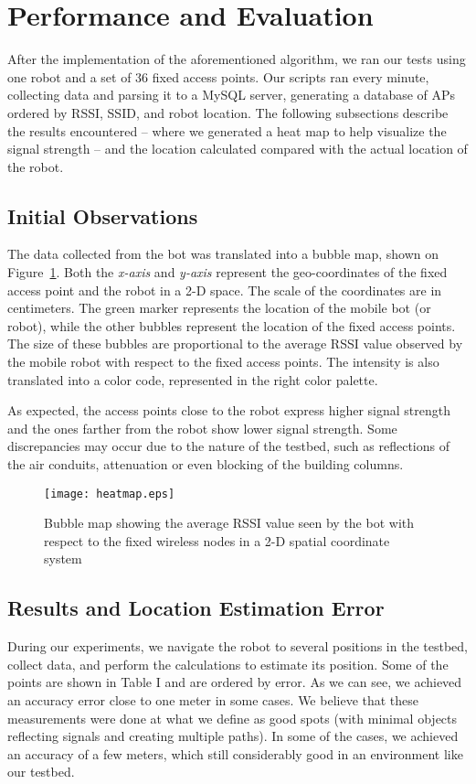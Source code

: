 \documentclass[journal]{IEEEtran} 				\IEEEoverridecommandlockouts 						\usepackage{amsmath,amssymb}
\begin{document}
\section{Performance and Evaluation}\label{sec:Performance and Evaluation}
After the implementation of the aforementioned algorithm, we ran our tests using one robot and a set of 36 fixed access points. Our scripts ran every minute, collecting data and parsing it to a MySQL server, generating a database of APs ordered by RSSI, SSID, and robot location.
The following subsections describe the results encountered -- where we generated a heat map to help visualize the signal strength -- and the location calculated compared with the actual location of the robot.

\subsection{Initial Observations}\label{sec:heat}

The data collected from the bot was translated into a bubble map, shown on Figure~\ref{fig:bubblemap}. Both the \textit{x-axis} and \textit{y-axis} represent the geo-coordinates of the fixed access point and the robot in a 2-D space. The scale of the coordinates are in centimeters. The green marker represents the location of the mobile bot (or robot), while the other bubbles represent the location of the fixed access points. The size of these bubbles are proportional to the average RSSI value observed by the mobile robot with respect to the fixed access points. The intensity is also translated into a color code, represented in the right color palette.

As expected, the access points close to the robot express higher signal strength and the ones farther from the robot show lower signal strength. Some discrepancies may occur due to the nature of the testbed, such as reflections of the air conduits, attenuation or even blocking of the building columns.

\begin{figure}
\centering
\texttt{[image: heatmap.eps]}
\caption{Bubble map showing the average RSSI value seen by the bot with respect to the fixed wireless nodes in a 2-D spatial coordinate system}
\label{fig:bubblemap}
\end{figure}



\subsection{Results and Location Estimation Error}\label{sec:error}
During our experiments, we navigate the robot to several positions in the testbed, collect data, and perform the calculations to estimate its position. Some of the points are shown in Table I and are ordered by error. As we can see, we achieved an accuracy error close to one meter in some cases. We believe that these measurements were done at what we define as good spots (with minimal objects reflecting signals and creating multiple paths). In some of the cases, we achieved an accuracy of a few meters, which still considerably good in an environment like our testbed.
\end{document}

